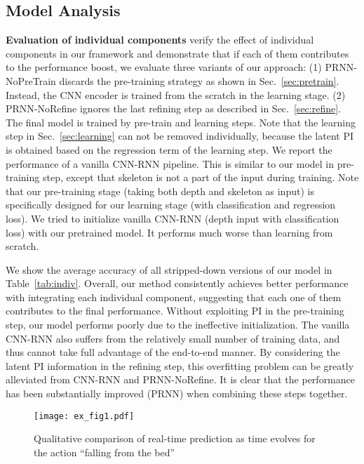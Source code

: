 \documentclass[10pt,twocolumn,letterpaper]{article}
\begin{document}
\vspace{-0.1cm}
\subsection{Model Analysis}

\noindent \textbf{Evaluation of individual components} \To verify the effect of individual components in our framework and demonstrate that if each of them contributes to the performance boost, we evaluate three variants of our approach: (1) PRNN-NoPreTrain discards the pre-training strategy as shown in Sec.~\ref{sec:pretrain}. Instead, the CNN encoder is trained from the scratch in the learning stage. (2) PRNN-NoRefine ignores the last refining step as described in Sec.~\ref{sec:refine}. The final model is trained by pre-train and learning steps. Note that the learning step in Sec.~\ref{sec:learning} can not be removed individually, because the latent PI is obtained based on the regression term of the learning step. We report the performance of a vanilla CNN-RNN pipeline. This is similar to our model in pre-training step, except that skeleton is not a part of the input during training. Note that our pre-training stage (taking both depth and skeleton as input) is specifically designed for our learning stage (with classification and regression loss). We tried to initialize vanilla CNN-RNN (depth input with classification loss) with our pretrained model. It performs much worse than learning from scratch.



We show the average accuracy of all stripped-down versions of our model in Table~\ref{tab:indiv}. Overall, our method consistently achieves better performance with integrating each individual component, suggesting that each one of them contributes to the final performance. Without exploiting PI in the pre-training step, our model performs poorly due to the ineffective initialization. The vanilla CNN-RNN also suffers from the relatively small number of training data, and thus cannot take full advantage of the end-to-end manner. By considering the latent PI information in the refining step, this overfitting problem can be greatly alleviated from CNN-RNN and PRNN-NoRefine. It is clear that the performance has been substantially improved (PRNN) when combining these steps together.







\begin{figure}[t]
\centering
   \texttt{[image: ex\_fig1.pdf]}

\caption{Qualitative comparison of real-time prediction as time evolves for the action ``falling from the bed''}
\label{fig:ex_frame}
\end{figure}
\end{document}
